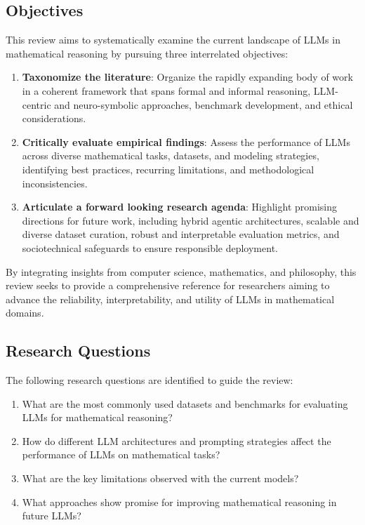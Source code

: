 \documentclass[acmsmall,anonymous]{acmart}
\begin{document}
\subsection{Objectives}
This review aims to systematically examine the current landscape of LLMs in mathematical reasoning by pursuing three interrelated objectives:
\begin{enumerate}
    \item \textbf{Taxonomize the literature}: Organize the rapidly expanding body of work in a coherent framework that spans formal and informal reasoning, LLM-centric and neuro-symbolic approaches, benchmark development, and ethical considerations. 
    \item \textbf{Critically evaluate empirical findings}: Assess the performance of LLMs across diverse mathematical tasks, datasets, and modeling strategies, identifying best practices, recurring limitations, and methodological inconsistencies. 
    \item \textbf{Articulate a forward looking research agenda}: Highlight promising directions for future work, including hybrid agentic architectures, scalable and diverse dataset curation, robust and interpretable evaluation metrics, and sociotechnical safeguards to ensure responsible deployment. 
\end{enumerate}

By integrating insights from computer science, mathematics, and philosophy, this review seeks to provide a comprehensive reference for researchers aiming to advance the reliability, interpretability, and utility of LLMs in mathematical domains. 

\subsection{Research Questions}
The following research questions are identified to guide the review:
\begin{enumerate}
    \item What are the most commonly used datasets and benchmarks for evaluating LLMs for mathematical reasoning? 
    \item How do different LLM architectures and prompting strategies affect the performance of LLMs on mathematical tasks? 
    \item What are the key limitations observed with the current models? 
    \item What approaches show promise for improving mathematical reasoning in future LLMs? 
\end{enumerate}
\end{document}
